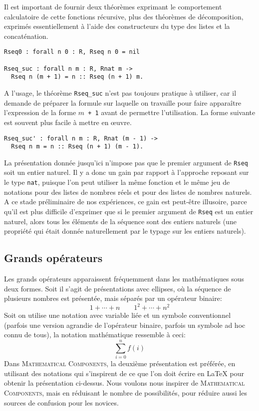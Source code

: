 \documentclass{jflart}
\newcommand{\mathcomp}{\textsc{Mathematical Components}}
\begin{document}
Il est important de fournir deux théorèmes exprimant
le comportement calculatoire de cette fonctions récursive, plus des
théorèmes de décomposition, exprimés essentiellement à l'aide des
constructeurs du type des listes et la concaténation.
\begin{verbatim}
Rseq0 : forall n 0 : R, Rseq n 0 = nil

Rseq_suc : forall n m : R, Rnat m ->
  Rseq n (m + 1) = n :: Rseq (n + 1) m.
\end{verbatim}
A l'usage, le théorème \texttt{Rseq\_suc} n'est pas toujours pratique à
utiliser, car il demande de préparer la formule sur laquelle on
travaille pour faire apparaître l'expression de la forme \texttt{\(m\) +
  1} avant de permettre l'utilisation.  La forme suivante est souvent
plus facile à mettre en œuvre.
\begin{verbatim}
Rseq_suc' : forall n m : R, Rnat (m - 1) ->
  Rseq n m = n :: Rseq (n + 1) (m - 1).
\end{verbatim}
La présentation donnée jusqu'ici n'impose pas que le premier argument
de \texttt{Rseq} soit un entier naturel.  Il y a donc un gain par rapport
à l'approche reposant sur le type \texttt{nat}, puisque l'on peut
utiliser la même fonction et le même jeu de notations pour des listes de
nombres réels et pour des listes de nombres naturels.  A ce stade
préliminaire de nos expériences, ce gain est peut-être illusoire,
parce qu'il est plus difficile d'exprimer que si le premier argument
de \texttt{Rseq} est un entier naturel, alors tous les éléments de la
séquence sont des entiers naturels (une propriété qui était donnée
naturellement par le typage sur les entiers naturels).

\subsection{Grands opérateurs}
Les grands opérateurs apparaissent fréquemment dans les mathématiques
sous deux formes.  Soit il s'agit de présentations avec ellipses, où
la séquence de plusieurs nombres est présentée, mais séparés par un
opérateur binaire:
\[1 + \cdots + n  \qquad 1 ^ 2 + \cdots + n ^ 2 \]
Soit on utilise une notation avec variable liée et un symbole
conventionnel (parfois une version agrandie de l'opérateur binaire,
parfois un symbole ad hoc connu de tous), la notation mathématique
ressemble à ceci:
\[\sum_{i=0}^{n} f(i)\]
Dans \mathcomp{}, la deuxième présentation est préférée, en utilisant
des notations qui s'inspirent de ce que l'on doit écrire en \LaTeX{}
pour obtenir la présentation ci-dessus.  Nous voulons nous inspirer de
\mathcomp{}, mais en réduisant le nombre de possibilités, pour réduire
aussi les sources de confusion pour les novices.
\end{document}
